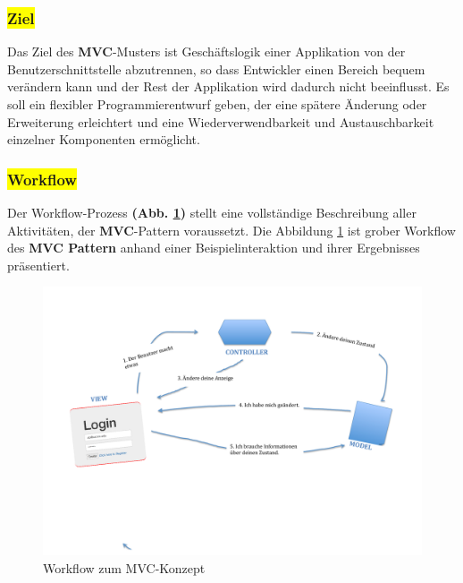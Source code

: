 \subsubsection{\colorbox{yellow}{Ziel}}

Das Ziel des \textbf{MVC}-Musters ist Geschäftslogik einer Applikation von der Benutzerschnittstelle abzutrennen, so dass Entwickler einen Bereich bequem verändern kann und der Rest der Applikation wird dadurch nicht beeinflusst.
Es soll ein flexibler Programmierentwurf geben, der eine spätere Änderung oder Erweiterung erleichtert und eine Wiederverwendbarkeit und Austauschbarkeit einzelner Komponenten ermöglicht.

\subsubsection{\colorbox{yellow}{Workflow}}

Der Workflow-Prozess \textbf{(Abb. \ref{img:mvc})} stellt eine vollständige Beschreibung aller Aktivitäten, der \textbf{MVC}-Pattern voraussetzt. Die Abbildung \ref{img:mvc} ist grober Workflow des \textbf{MVC Pattern} anhand einer Beispielinteraktion und ihrer Ergebnisses präsentiert.
\begin{figure}[H]
\centering
\includegraphics[trim = 0mm 60mm 0mm 20mm, clip, width=1.0\textwidth]{resources/mvc}
\caption[Workflow zum MVC-Konzept]{Workflow zum MVC-Konzept}
\label{img:mvc}
\end{figure}

